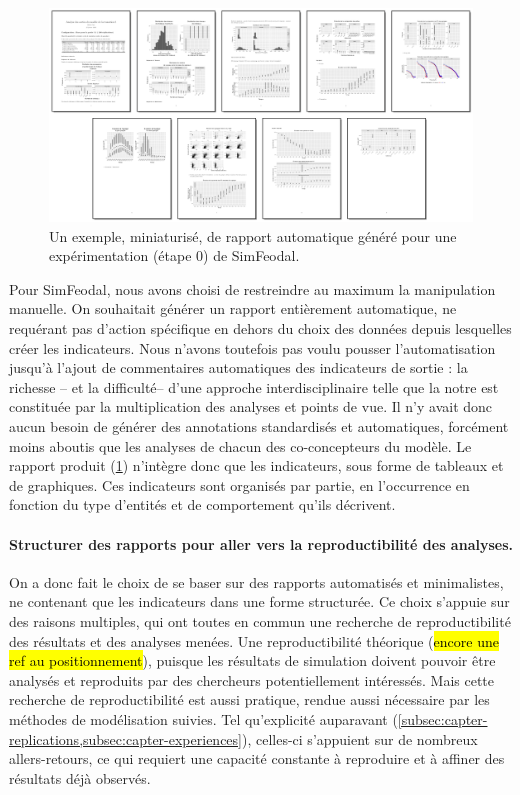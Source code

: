 \begin{figure}[H]
	\captionsetup{width=\linewidth}
	\includegraphics[width=\linewidth]{img/SimFeodal_Rapport_exemple.png}
	\caption[Un exemple de rapport automatique généré pour SimFeodal.]{Un exemple, miniaturisé, de rapport automatique généré pour une expérimentation (étape 0) de SimFeodal.}
	\label{fig:simfeodal_rapport_mini}
\end{figure}

Pour SimFeodal, nous avons choisi de restreindre au maximum la manipulation manuelle.
On souhaitait générer un rapport entièrement automatique, ne requérant pas d'action spécifique en dehors du choix des données depuis lesquelles créer les indicateurs.
Nous n'avons toutefois pas voulu pousser l'automatisation jusqu'à l'ajout de commentaires automatiques des indicateurs de sortie :
	la richesse -- et la difficulté-- d'une approche interdisciplinaire telle que la notre est constituée par la multiplication des analyses et points de vue.
Il n'y avait donc aucun besoin de générer des annotations standardisés et automatiques, forcément moins aboutis que les analyses de chacun des co-concepteurs du modèle.
Le rapport produit (\cref{fig:simfeodal_rapport_mini}) n'intègre donc que les indicateurs, sous forme de tableaux et de graphiques.
Ces indicateurs sont organisés par partie, en l'occurrence en fonction du type d'entités et de comportement qu'ils décrivent.

\paragraph{Structurer des rapports pour aller vers la reproductibilité des analyses.}

On a donc fait le choix de se baser sur des rapports automatisés et minimalistes, ne contenant que les indicateurs dans une forme structurée.
Ce choix s'appuie sur des raisons multiples, qui ont toutes en commun une recherche de reproductibilité des résultats et des analyses menées.
Une reproductibilité théorique (\hl{encore une ref au positionnement}), puisque les résultats de simulation doivent pouvoir être analysés et reproduits par des chercheurs potentiellement intéressés.
Mais cette recherche de reproductibilité est aussi pratique, rendue aussi nécessaire par les méthodes de modélisation suivies.
Tel qu'explicité auparavant (\cref{subsec:capter-replications,subsec:capter-experiences}), celles-ci s'appuient sur de nombreux allers-retours, ce qui requiert une capacité constante à reproduire et à affiner des résultats déjà observés.

